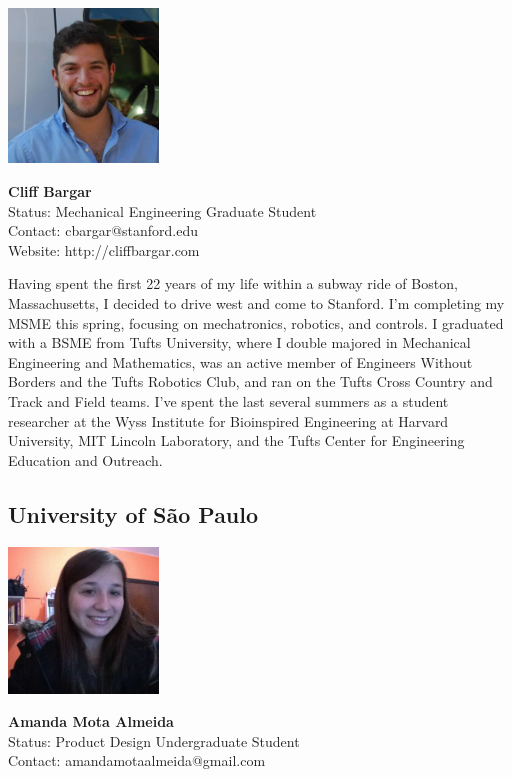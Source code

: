 \noindent \includegraphics[width=40mm]{images/cliff.jpg}
\parbox[b]{0.6\textwidth}{\textbf{Cliff Bargar}\\
Status: Mechanical Engineering Graduate Student\\
Contact: cbargar@stanford.edu \\
Website: http://cliffbargar.com \\
}

Having spent the first 22 years of my life within a subway ride of Boston, Massachusetts, I decided to drive west and come to Stanford. I'm completing my MSME this spring, focusing on mechatronics, robotics, and controls. I graduated with a BSME from Tufts University, where I double majored in Mechanical Engineering and Mathematics, was an active member of Engineers Without Borders and the Tufts Robotics Club, and ran on the Tufts Cross Country and Track and Field teams. I've spent the last several summers as a student researcher at the Wyss Institute for Bioinspired Engineering at Harvard University, MIT Lincoln Laboratory, and the Tufts Center for Engineering Education and Outreach.

\subsection*{University of S\~{a}o Paulo}

\noindent \includegraphics[width=40mm]{images/image013}
\parbox[b]{0.6\textwidth}{\textbf{Amanda Mota Almeida}\\
Status: Product Design Undergraduate Student\\
Contact: amandamotaalmeida@gmail.com \\
}


